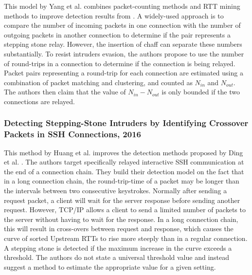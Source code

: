 \documentclass[runningheads]{llncs}\usepackage[]{graphicx}\usepackage[]{color}
\begin{document}
This model by Yang et al. \cite{yang2015rtt} combines packet-counting methods and RTT mining methods to improve detection results from \cite{yang2007mining}. 
A widely-used approach is to compare the number of incoming packets in one connection with the number of outgoing packets in another connection  to determine if the pair represents a stepping stone relay. However, the insertion of chaff can separate these numbers substantially.
To resist intruders  evasion,  the authors  propose  to use the  number of  round-trips in  a  connection  to  determine  if  the  connection  is being  relayed.
Packet pairs representing a round-trip for each connection are estimated using a combination of packet matching and clustering, and counted as $N_{in}$ and $N_{out}$. The authors then claim that the value of $N_{in}-N_{out}$ is only bounded if the two connections are relayed.

\subsubsection{Detecting Stepping-Stone Intruders by Identifying Crossover Packets in SSH Connections, 2016}

This method by Huang et al. \cite{huang2016detecting} improves the detection methods proposed by Ding et al. \cite{ding2009detecting}. The authors target specifically relayed interactive SSH communication at the end of a connection chain. They build their detection model on the fact that in a long connection chain, the round-trip-time of a packet may be longer than the intervals between two consecutive keystrokes. Normally after sending a request packet, a client will wait for the server response before sending another request. However, TCP/IP allows a client to send a limited number of packets to the server without having to wait for the response. In a long connection chain, this will result in cross-overs between request and response, which causes the curve of sorted Upstream RTTs to rise more steeply than in a regular connection. A stepping stone is detected if the maximum increase in the curve exceeds a threshold. The authors do not state a universal threshold value and instead suggest a method to estimate the appropriate value for a given setting.



\end{document}
